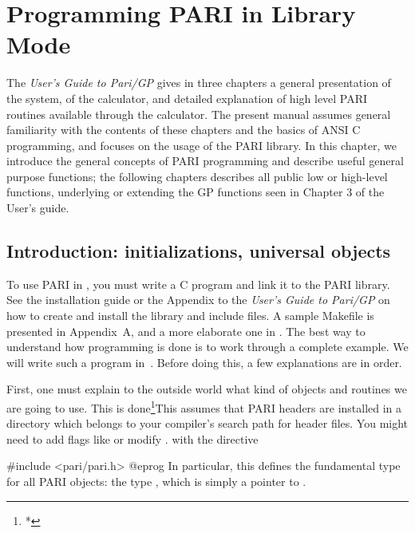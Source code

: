 %
%
\chapter{Programming PARI in Library Mode}

\noindent The \emph{User's Guide to Pari/GP} gives in three chapters a
general presentation of the system, of the  calculator, and detailed
explanation of high level PARI routines available through the calculator. The
present manual assumes general familiarity with the contents of these
chapters and the basics of ANSI C programming, and focuses on the usage of
the PARI library. In this chapter, we introduce the general concepts of PARI
programming and describe useful general purpose functions; the following
chapters describes all public low or high-level functions, underlying or
extending the GP functions seen in Chapter 3 of the User's guide.

\section{Introduction: initializations, universal objects}
\label{se:intro4}

\noindent
To use PARI in , you must write a C program and link it to
the PARI library. See the installation guide or the Appendix to the
\emph{User's Guide to Pari/GP} on how to create and install the library and
include files. A sample Makefile is presented in Appendix~A, and a more
elaborate one in . The best way to understand how
programming is done is to work through a complete example. We will write such
a program in~. Before doing this, a few explanations are in
order.

First, one must explain to the outside world what kind of objects and
routines we are going to use. This is done\footnote{*}{This assumes that PARI
headers are installed in a directory which belongs to your compiler's search
path for header files. You might need to add flags like
 or modify .}
with the directive

\bprog
#include <pari/pari.h>
@eprog
\noindent
In particular, this defines the fundamental type for all PARI objects: the
type , which is simply a pointer to .

